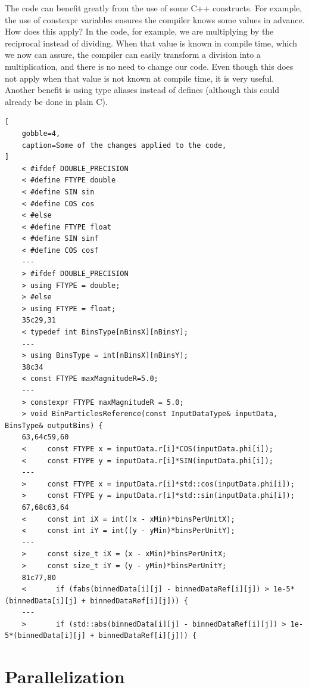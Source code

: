 \documentclass[
    12pt, %
]{fphw}
\begin{document}
    The code can benefit greatly from the use of some C++ constructs.
For example, the use of constexpr variables ensures
the compiler knows some values in advance.
How does this apply?
In the code, for example, we are multiplying by the reciprocal instead of dividing.
When that value is known in compile time, which we now can assure,
the compiler can easily transform a division into a multiplication,
and there is no need to change our code.
Even though this does not apply when that value is not known at compile time,
it is very useful.
Another benefit is using type aliases instead of defines
(although this could already be done in plain C).

\begin{lstlisting}[
    gobble=4,
    caption=Some of the changes applied to the code,
]
    < #ifdef DOUBLE_PRECISION
    < #define FTYPE double
    < #define SIN sin
    < #define COS cos
    < #else
    < #define FTYPE float
    < #define SIN sinf
    < #define COS cosf
    ---
    > #ifdef DOUBLE_PRECISION
    > using FTYPE = double;
    > #else
    > using FTYPE = float;
    35c29,31
    < typedef int BinsType[nBinsX][nBinsY];
    ---
    > using BinsType = int[nBinsX][nBinsY];
    38c34
    < const FTYPE maxMagnitudeR=5.0;
    ---
    > constexpr FTYPE maxMagnitudeR = 5.0;
    > void BinParticlesReference(const InputDataType& inputData, BinsType& outputBins) {
    63,64c59,60
    <     const FTYPE x = inputData.r[i]*COS(inputData.phi[i]);
    <     const FTYPE y = inputData.r[i]*SIN(inputData.phi[i]);
    ---
    >     const FTYPE x = inputData.r[i]*std::cos(inputData.phi[i]);
    >     const FTYPE y = inputData.r[i]*std::sin(inputData.phi[i]);
    67,68c63,64
    <     const int iX = int((x - xMin)*binsPerUnitX);
    <     const int iY = int((y - yMin)*binsPerUnitY);
    ---
    >     const size_t iX = (x - xMin)*binsPerUnitX;
    >     const size_t iY = (y - yMin)*binsPerUnitY;
    81c77,80
    <       if (fabs(binnedData[i][j] - binnedDataRef[i][j]) > 1e-5*(binnedData[i][j] + binnedDataRef[i][j])) {
    ---
    >       if (std::abs(binnedData[i][j] - binnedDataRef[i][j]) > 1e-5*(binnedData[i][j] + binnedDataRef[i][j])) {

\end{lstlisting}

\section{Parallelization}
\end{document}
